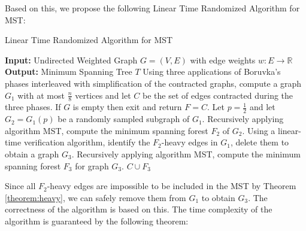 \documentclass[11pt]{article}
\theoremstyle{plain}
\begin{document}
Based on this, we propose the following Linear Time Randomized Algorithm for MST\cite{karger1995randomized}:

\begin{algorithm}
    \caption{Linear Time Randomized Algorithm for MST}
    \begin{algorithmic}[1]
    \label{alg:randomizedmst}
    \STATE \textbf{Input:} Undirected Weighted Graph $G=(V,E)$ with edge weights $w:E\to \mathbb{R}$
    \STATE \textbf{Output:} Minimum Spanning Tree $T$
    \STATE Using three applications of Boruvka's phases interleaved with simplification of the contracted graphs, compute a graph $G_1$ with at most $\frac{n}{8}$ vertices and let $C$ be the set of edges contracted during the three phases. If $G$ is empty then exit and return $F=C$.
    \STATE Let $p=\frac{1}{2}$ and let $G_2=G_1(p)$ be a randomly sampled subgraph of $G_1$.
    \STATE Recursively applying algorithm MST, compute the minimum spanning forest $F_2$ of $G_2$.
    \STATE Using a linear-time verification algorithm, identify the $F_2$-heavy edges in $G_1$, delete them to obtain a graph $G_3$.
    \STATE Recursively applying algorithm MST, compute the minimum spanning forest $F_3$ for graph $G_3$.
    \RETURN $C\cup F_3$
    \end{algorithmic}
\end{algorithm}

Since all $F_2$-heavy edges are impossible to be included in the MST by Theorem \ref{theorem:heavy}, we can safely remove them from $G_1$ to obtain $G_3$. The correctness of the algorithm is based on this. The time complexity of the algorithm is guaranteed by the following theorem:
\end{document}
